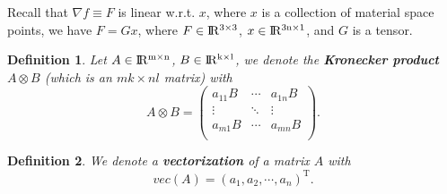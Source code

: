 \documentclass{fancydoc}
\newtheorem{mydef}{Definition}
\newcommand{\trans}{\mathrm{T}}
\newcommand{\realR}{\rm I\!R}
\begin{document}
Recall that $\nabla f \equiv F$ is linear w.r.t. $x$, where $x$ is a collection of material space points, we have $F = G x$, where $F \in \realR^{3 \times 3}$, $x \in \realR^{3n \times 1}$, and $G$ is a tensor.

\begin{mydef}
	Let $A \in \realR^{m \times n}$, $B \in \realR^{k \times l}$, we denote the \textbf{Kronecker product} $A \otimes B$ (which is  an $mk \times nl$ matrix) with \begin{equation}
	A \otimes B = \begin{pmatrix}
	a_{11}B & \cdots & a_{1n}B \\
	\vdots & \ddots & \vdots \\
	a_{m1}B & \cdots & a_{mn}B\\
	\end{pmatrix}.
	\end{equation}
\end{mydef}
\begin{mydef}
	We denote a \textbf{vectorization} of a matrix $A$ with
	\begin{equation}
	vec(A) = (a_1, a_2, \cdots, a_n)^\trans.
	\end{equation}
\end{mydef}
\end{document}
